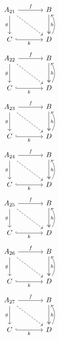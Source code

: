\documentclass{article}
\begin{document}
\begin{equation}\begin{tikzcd}[column sep=large,row sep=large]
A_{21} \arrow[r,"f"] \arrow[d,"g"'] \arrow[dr,dashed] & B \arrow[d,two heads,"h"] \\ C \arrow[r,"k"',hook] & D \arrow[u,bend right]
\end{tikzcd}\end{equation}
\begin{equation}\begin{tikzcd}[column sep=large,row sep=large]
A_{22} \arrow[r,"f"] \arrow[d,"g"'] \arrow[dr,dashed] & B \arrow[d,two heads,"h"] \\ C \arrow[r,"k"',hook] & D \arrow[u,bend right]
\end{tikzcd}\end{equation}
\begin{equation}\begin{tikzcd}[column sep=large,row sep=large]
A_{23} \arrow[r,"f"] \arrow[d,"g"'] \arrow[dr,dashed] & B \arrow[d,two heads,"h"] \\ C \arrow[r,"k"',hook] & D \arrow[u,bend right]
\end{tikzcd}\end{equation}
\begin{equation}\begin{tikzcd}[column sep=large,row sep=large]
A_{24} \arrow[r,"f"] \arrow[d,"g"'] \arrow[dr,dashed] & B \arrow[d,two heads,"h"] \\ C \arrow[r,"k"',hook] & D \arrow[u,bend right]
\end{tikzcd}\end{equation}
\begin{equation}\begin{tikzcd}[column sep=large,row sep=large]
A_{25} \arrow[r,"f"] \arrow[d,"g"'] \arrow[dr,dashed] & B \arrow[d,two heads,"h"] \\ C \arrow[r,"k"',hook] & D \arrow[u,bend right]
\end{tikzcd}\end{equation}
\begin{equation}\begin{tikzcd}[column sep=large,row sep=large]
A_{26} \arrow[r,"f"] \arrow[d,"g"'] \arrow[dr,dashed] & B \arrow[d,two heads,"h"] \\ C \arrow[r,"k"',hook] & D \arrow[u,bend right]
\end{tikzcd}\end{equation}
\begin{equation}\begin{tikzcd}[column sep=large,row sep=large]
A_{27} \arrow[r,"f"] \arrow[d,"g"'] \arrow[dr,dashed] & B \arrow[d,two heads,"h"] \\ C \arrow[r,"k"',hook] & D \arrow[u,bend right]
\end{tikzcd}\end{equation}
\end{document}
